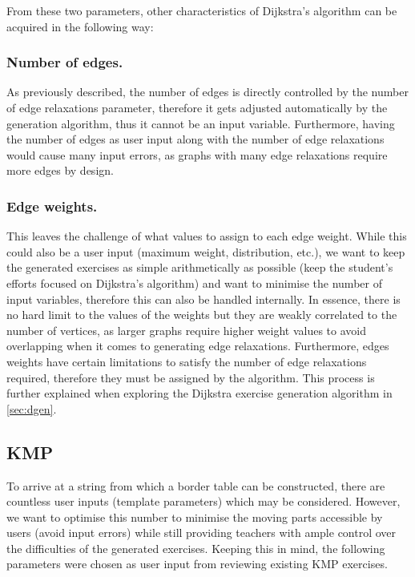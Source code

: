 \documentclass{l4proj}
\begin{document}
From these two parameters, other characteristics of Dijkstra's algorithm can be acquired in the following way:

\subsubsection{Number of edges.}
\label{sec:noe}

As previously described, the number of edges is directly controlled by the number of edge relaxations parameter, therefore it gets adjusted automatically by the generation algorithm, thus it cannot be an input variable. Furthermore, having the number of edges as user input along with the number of edge relaxations would cause many input errors, as graphs with many edge relaxations require more edges by design. 

\subsubsection{Edge weights.}

This leaves the challenge of what values to assign to each edge weight. While this could also be a user input (maximum weight, distribution, etc.), we want to keep the generated exercises as simple arithmetically as possible (keep the student's efforts focused on Dijkstra's algorithm) and want to minimise the number of input variables, therefore this can also be handled internally. In essence, there is no hard limit to the values of the weights but they are weakly correlated to the number of vertices, as larger graphs require higher weight values to avoid overlapping when it comes to generating edge relaxations. Furthermore, edges weights have certain limitations to satisfy the number of edge relaxations required, therefore they must be assigned by the algorithm. This process is further explained when exploring the Dijkstra exercise generation algorithm in \autoref{sec:dgen}. 

\subsection{KMP}

To arrive at a string from which a border table can be constructed, there are countless user inputs (template parameters) which may be considered. However, we want to optimise this number to minimise the moving parts accessible by users (avoid input errors) while still providing teachers with ample control over the difficulties of the generated exercises. Keeping this in mind, the following parameters were chosen as user input from reviewing existing KMP exercises.
\end{document}
